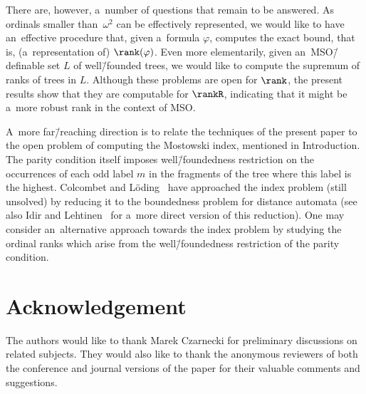 \documentclass{lmcs}
\numberwithin{equation}{section}
\numberwithin{figure}{section}
\begin{document}
There are, however, a~number of questions that remain to be answered.
As ordinals smaller than~$\omega^2$ can be effectively represented, we would like to have an~effective procedure that, given a~formula $\varphi$, computes the exact bound,
that is, (a~representation of) $\rank(\varphi)$.
Even more elementarily, given an~MSO\=/definable set $L$ of
well\=/founded trees, we would like to compute the supremum of ranks of trees in $L$. Although these problems are open for $\rank$, the present results show that they are computable for $\rankR$, indicating that it might be a~more robust rank in the context of MSO.

A~more far\=/reaching direction is to relate the techniques of the present paper to the open problem of computing the Mostowski index, mentioned in Introduction.
The parity condition itself imposes well\=/foundedness restriction on the occurrences of each odd label $m$ in the fragments of the tree where this label is the highest.
Colcombet and Löding~\cite{loding_index_to_bounds} have approached the index problem (still unsolved) by reducing it to the boundedness problem for distance automata
(see also Idir and Lehtinen~\cite{lehtinen_mostowski} for a~more direct version of this reduction).
One may consider an~alternative approach towards the index problem by studying the ordinal ranks which arise from the well\=/foundedness restriction of the parity condition.


\section*{Acknowledgement}\noindent
The authors would like to thank Marek Czarnecki for preliminary discussions on related subjects.
They would also like to thank the anonymous reviewers of both the conference and journal versions of the paper for their valuable comments and suggestions.




\end{document}
